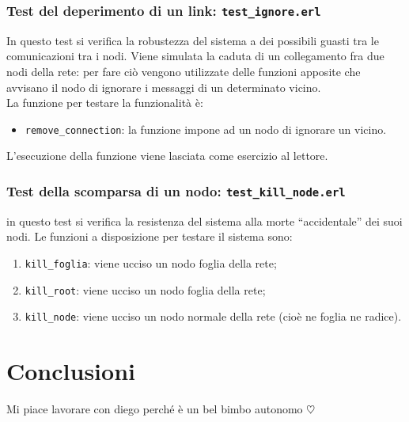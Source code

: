 \documentclass[italian]{memoir}
\begin{document}
\subsection{Test del deperimento di un link: \texttt{test\_ignore.erl}}
In questo test si verifica la robustezza del sistema a dei possibili guasti tra le comunicazioni tra i nodi. Viene simulata la caduta di un collegamento fra due nodi della rete: per fare ciò vengono utilizzate delle funzioni apposite che avvisano il nodo di ignorare i messaggi di un determinato vicino.\\
La funzione per testare la funzionalità è:
\begin{itemize}
    \item \texttt{remove\_connection}: la funzione impone ad un nodo di ignorare un vicino.
\end{itemize}
L'esecuzione della funzione viene lasciata come esercizio al lettore.

\subsection{Test della scomparsa di un nodo: \texttt{test\_kill\_node.erl}}
in questo test si verifica la resistenza del sistema alla morte ``accidentale'' dei suoi nodi. Le funzioni a disposizione per testare il sistema sono:
\begin{enumerate}
    \item \texttt{kill\_foglia}: viene ucciso un nodo foglia della rete;
    \item \texttt{kill\_root}: viene ucciso un nodo foglia della rete;
    \item \texttt{kill\_node}: viene ucciso un nodo normale della rete (cioè ne foglia ne radice).
\end{enumerate}


\chapter{Conclusioni}
Mi piace lavorare con diego perché è un bel bimbo autonomo $\heartsuit$

%

%
\end{document}
